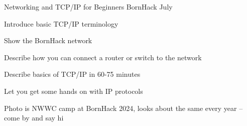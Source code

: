 \documentclass[Screen16to9,17pt]{foils}
\begin{document}





\mytitlepage
{Networking and TCP/IP for Beginners}
{BornHack July \the\year{}}


\hlkprofiluk



\begin{list2}
\item Introduce basic TCP/IP terminology
\item Show the BornHack network
\item Describe how you can connect a router or switch to the network
\item Describe basics of TCP/IP in 60-75 minutes
\item Let you get some hands on with IP protocols
\end{list2}

Photo is NWWC camp at BornHack 2024, looks about the same every year
--come by and say hi
\end{document}
